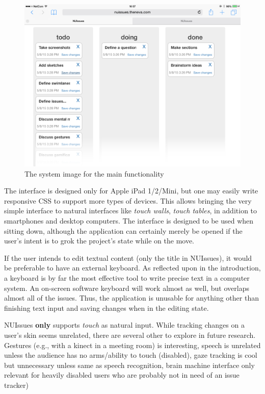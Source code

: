 \begin{figure}[H]
    \centerline{\includegraphics[scale=0.4]{images/nuissues-screenshots/01-default-all-swimlanes}}
    \caption{The system image for the main functionality}
    \label{figure:ipad-default-simple-screenshots}  
\end{figure}

The interface is designed only for Apple iPad 1/2/Mini, but one may easily write responsive CSS to support more types of devices. This allows bringing the very simple interface to natural interfaces like \textit{touch walls}, \textit{touch tables}, in addition to smartphones and desktop computers. The interface is designed to be used when sitting down, although the application can certainly merely be opened if the user's intent is to grok the project's state while on the move.

If the user intends to edit textual content (only the title in NUIssues), it would be preferable to have an external keyboard. As reflected upon in the introduction, a keyboard is by far the most effective tool to write precise text in a computer system. An on-screen software keyboard will work almost as well, but overlaps almost all of the issues. Thus, the application is unusable for anything other than finishing text input and saving changes when in the editing state.


NUIssues \textbf{only} supports \textit{touch} as natural input. While tracking changes on a user's skin seems unrelated, there are several other to explore in future research. Gestures (e.g., with a kinect in a meeting room) is interesting, speech is unrelated unless the audience has no arms/ability to touch (disabled), gaze tracking is cool but unnecessary unless same as speech recognition, brain machine interface only relevant for heavily disabled users who are probably not in need of an issue tracker)

